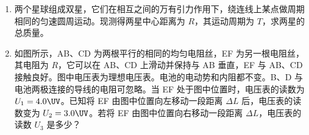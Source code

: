 \documentclass[\gkver]{gaokaozhenti}
\begin{document}
\begin{enumerate}
{光线由折射率为 $n$ 的玻璃到真空，折射定律为

$\sin r=n\sin i$   ①

其中 $i$ 和 $r$ 分别为入射角和折射角。当入射角 $i$ 等于临界角 $C$ 时，折射角 $r$ 等于 $90\Udu$，代入①式得

$\sin C=\frac{1}{n}$   ②

评分标准：本题 11 分。能正确叙述全反射现象及临界角定义的，给 6 分（如果没有说明全反射，只说临界角是发生全反射的最小入射角的，只给 2 分）。导出②式或 $C=\arcsin\frac{1}{n}$ 的，给 5 分。
}

\item
两个星球组成双星，它们在相互之间的万有引力作用下，绕连线上某点做周期相同的匀速圆周运动。现测得两星中心距离为 $R$，其运动周期为 $T$，求两星的总质量。


\item
如图所示，AB、CD 为两根平行的相同的均匀电阻丝，EF 为另一根电阻丝，其电阻为 $R$，它可以在 AB、CD 上滑动并保持与 AB 垂直，EF 与 AB、CD 接触良好。图中电压表为理想电压表。电池的电动势和内阻都不变。B、D 与电池两极连接的导线的电阻可忽略。当 EF 处于图中位置时，电压表的读数为 $U_{1}=4.0\UV$。已知将 EF 由图中位置向左移动一段距离 $\Delta L$ 后，电压表的读数变为 $U_{2}=3.0\UV$。若将 EF 由图中位置向右移动一段距离 $\Delta L$，电压表的读数 $U_{3}$ 是多少？



\end{enumerate}
\end{document}

